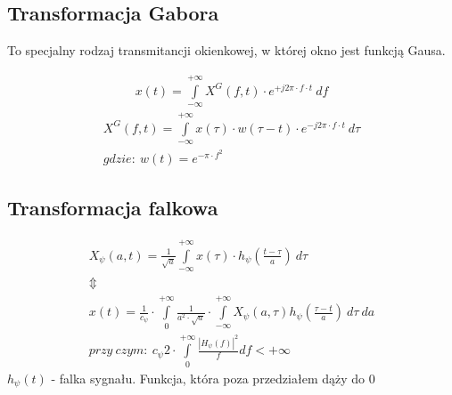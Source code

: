     \subsection{Transformacja Gabora}
        \tab To specjalny rodzaj transmitancji okienkowej, w której okno jest funkcją Gausa.
        \begin{multicols}{2}
            \begin{gather*}
                x(t) = \int \limits_{-\infty}^{+\infty} X^G(f, t)\cdot e^{+j2\pi \cdot f \cdot t}\ df
            \end{gather*}\hfill
            \noindent
            \begin{gather*}
                X^G(f, t) = \int \limits_{-\infty}^{+\infty}x(\tau)\cdot w(\tau-t)\cdot e^{-j2\pi\cdot f\cdot t}\ d\tau\\
                gdzie:\ w(t) = e^{-\pi\cdot f^2}
            \end{gather*}
        \end{multicols}

    \subsection{Transformacja falkowa}
    \begin{gather*}
        X_\psi(a, t) = \frac{1}{\sqrt{a}}\int\limits_{-\infty}^{+\infty}x(\tau)\cdot h_\psi\left(\frac{t-\tau}{a}\right)\ d\tau\\
        \Updownarrow\\
        x(t) = \frac{1}{c_\psi}\cdot \int\limits_{0}^{+\infty}\frac{1}{a^2\cdot\sqrt{a}}\cdot \int\limits_{-\infty}^{+\infty}X_\psi(a, \tau)h_\psi\left(\frac{\tau-t}{a}\right)\ d\tau\ da\\
        przy\ czym:\ c_\psi 2\cdot \int\limits_{0}^{+\infty}\frac{|H_\psi(f)|^2}{f}df < +\infty
    \end{gather*}
    $h_\psi(t)$ - falka sygnału. Funkcja, która poza przedziałem dąży do 0
    